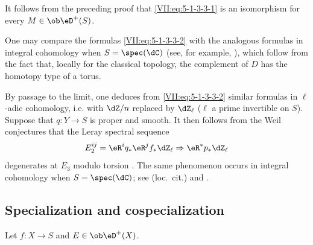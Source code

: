 It follows from the preceding proof that \eqref{VII:eq:5-1-3-3-1} is an
isomorphism for every $M\in\ob\eD^+(S)$.

One may compare the formulas \eqref{VII:eq:5-1-3-3-2} with the analogous
formulas in integral cohomology when $S=\spec(\dC)$ (see, for example,
\cite[3.1]{de71-2}), which follow from the fact that, locally for the classical
topology, the complement of $D$ has the homotopy type of a torus.

By passage to the limit, one deduces from \eqref{VII:eq:5-1-3-3-2} similar
formulas in $\ell$-adic cohomology, i.e. with $\dZ/n$ replaced by $\dZ_\ell$
($\ell$ a prime invertible on $S$). Suppose that $q:Y\to S$ is proper and
smooth. It then follows from the Weil conjectures \cite{de74,de80} that the
Leray spectral sequence
\[
  E_2^{i j} = \eR^i q_\ast \eR^j f_\ast \dZ_\ell \Rightarrow \eR^\ast p_\ast \dZ_\ell 
\]
degenerates at $E_3$ modulo torsion \cite[\S 6]{de71-1}. The same phenomenon
occurs in integral cohomology when $S=\spec(\dC)$; see (loc.\ cit.) and
\cite[3.2.13]{de71-2}.





\subsection{Specialization and cospecialization}\label{VII:5-2}

Let $f:X\to S$ and $E\in\ob\eD^+(X)$.






\subsubsection{}\label{VII:5-2-1}

